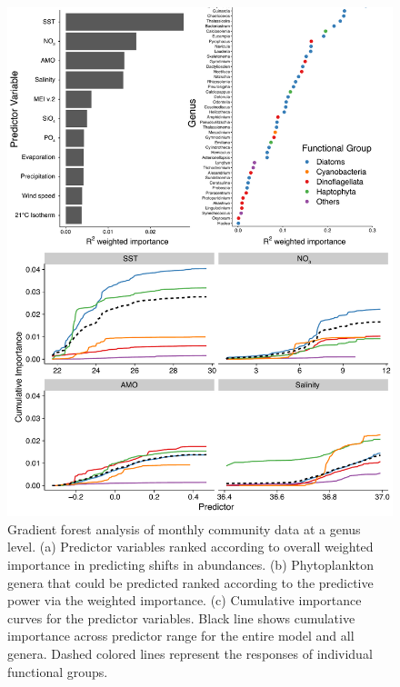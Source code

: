\documentclass[draft]{agujournal2019}
\begin{document}
\begin{figure}
\noindent\includegraphics[width=\textwidth]{fig/FigureA3_GF_output_NOLAG_v1.pdf}
\caption{Gradient forest analysis of monthly community data at a genus level. (a) Predictor variables ranked according to overall weighted importance in predicting shifts in abundances. (b) Phytoplankton genera that could be predicted ranked according to the predictive power via the weighted importance. (c) Cumulative importance curves for the predictor variables. Black line shows cumulative importance across predictor range for the entire model and all genera. Dashed colored lines represent the responses of individual functional groups.}
\label{fig:sup:GFoutput_nolags}
\end{figure}
\end{document}
